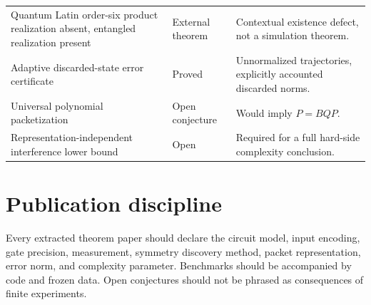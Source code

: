 \begin{longtable}{@{}L{.31\textwidth}L{.16\textwidth}L{.43\textwidth}@{}}
Quantum Latin order-six product realization absent, entangled realization present & External theorem & Contextual existence defect, not a simulation theorem.\\
Adaptive discarded-state error certificate & Proved & Unnormalized trajectories, explicitly accounted discarded norms.\\
Universal polynomial packetization & Open conjecture & Would imply $P=BQP$.\\
Representation-independent interference lower bound & Open & Required for a full hard-side complexity conclusion.\\
\bottomrule
\end{longtable}

\section{Publication discipline}
Every extracted theorem paper should declare the circuit model, input encoding, gate precision, measurement, symmetry discovery method, packet representation, error norm, and complexity parameter. Benchmarks should be accompanied by code and frozen data. Open conjectures should not be phrased as consequences of finite experiments.
